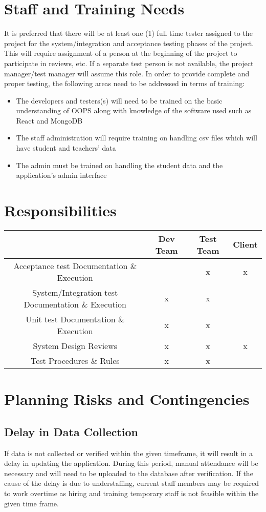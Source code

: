 \documentclass{scrreprt}
\begin{document}
\chapter{Staff and Training Needs}
It is preferred that there will be at least one (1) full time tester assigned to the project for the system/integration and acceptance testing phases of the project. This will require assignment of a person at the beginning of the project to participate in reviews, etc. If a separate test person is not available, the project manager/test manager will assume this role.
In order to provide complete and proper testing, the following areas need to be addressed in terms of training:
\begin{itemize}
    \item The developers and testers(s) will need to be trained on the basic understanding of OOPS along with knowledge of the software used such as React and MongoDB
    \item The staff administration will require training on handling csv files which will have student and teachers’ data
    \item The admin must be trained on handling the student data and the application’s admin interface
\end{itemize}

\chapter{Responsibilities}
\begin{center}
\begin{tabular}{|c | c | c | c|} 
 \hline
   & Dev Team & Test Team & Client \\ [0.5ex] 
 \hline
 Acceptance test Documentation \& Execution  &  & x & x \\ 
 \hline
 System/Integration test Documentation \& Execution & x & x &  \\
 \hline
 Unit test Documentation \& Execution & x & x &  \\
 \hline
 System Design Reviews & x & x & x \\
 \hline
 Test Procedures \& Rules & x & x &  \\ [1ex] 
 \hline
\end{tabular}
\end{center}

\chapter{Planning Risks and Contingencies}
\section{Delay in Data Collection}
If data is not collected or verified within the given timeframe, it will result in a delay in updating the application. During this period, manual attendance will be necessary and will need to be uploaded to the database after verification.
If the cause of the delay is due to understaffing, current staff members may be required to work overtime as hiring and training temporary staff is not feasible within the given time frame.
\end{document}

